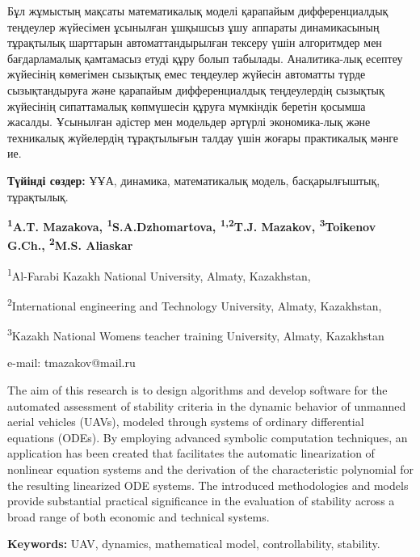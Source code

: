 Бұл жұмыстың мақсаты математикалық моделі қарапайым дифференциалдық
теңдеулер жүйесімен ұсынылған ұшқышсыз ұшу аппараты динамикасының
тұрақтылық шарттарын автоматтандырылған тексеру үшін алгоритмдер мен
бағдарламалық қамтамасыз етуді құру болып табылады. Аналитика-лық есептеу
жүйесінің көмегімен сызықтық емес теңдеулер жүйесін автоматты түрде
сызықтандыруға және қарапайым дифференциалдық теңдеулердің сызықтық
жүйесінің сипаттамалық көпмүшесін құруға мүмкіндік беретін қосымша
жасалды. Ұсынылған әдістер мен модельдер әртүрлі экономика-лық және
техникалық жүйелердің тұрақтылығын талдау үшін жоғары практикалық мәнге
ие.

{\bfseries Түйінді сөздер:} ҰҰА, динамика, математикалық модель,
басқарылғыштық, тұрақтылық.



\begin{center}
{\bfseries \textsuperscript{1}A.T. Mazakova,
\textsuperscript{1}S.A.Dzhomartova, \textsuperscript{1,2}T.J.
Mazakov\envelope, \textsuperscript{3}Toikenov G.Ch., \textsuperscript{2}M.S. Aliaskar}

\textsuperscript{1}Al-Farabi Kazakh National University, Almaty,
Kazakhstan,

\textsuperscript{2}International engineering and Technology University,
Almaty, Kazakhstan,

\textsuperscript{3}Kazakh National Women\textquotesingle s teacher
training University, Almaty, Kazakhstan

e-mail: tmazakov@mail.ru
\end{center}

The aim of this research is to design algorithms and develop software
for the automated assessment of stability criteria in the dynamic
behavior of unmanned aerial vehicles (UAVs), modeled through systems of
ordinary differential equations (ODEs). By employing advanced symbolic
computation techniques, an application has been created that facilitates
the automatic linearization of nonlinear equation systems and the
derivation of the characteristic polynomial for the resulting linearized
ODE systems. The introduced methodologies and models provide substantial
practical significance in the evaluation of stability across a broad
range of both economic and technical systems.

{\bfseries Keywords:} UAV, dynamics, mathematical model, controllability,
stability.

